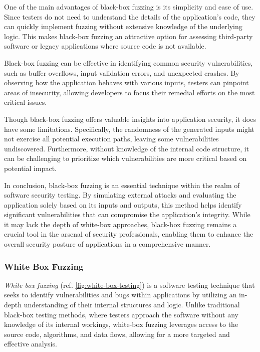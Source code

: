 One of the main advantages of black-box fuzzing is its simplicity and ease of use. Since testers do not need to understand the details of the application’s code, they can quickly implement fuzzing without extensive knowledge of the underlying logic. This makes black-box fuzzing an attractive option for assessing third-party software or legacy applications where source code is not available.

Black-box fuzzing can be effective in identifying common security vulnerabilities, such as buffer overflows, input validation errors, and unexpected crashes. By observing how the application behaves with various inputs, testers can pinpoint areas of insecurity, allowing developers to focus their remedial efforts on the most critical issues.

Though black-box fuzzing offers valuable insights into application security, it does have some limitations. Specifically, the randomness of the generated inputs might not exercise all potential execution paths, leaving some vulnerabilities undiscovered. Furthermore, without knowledge of the internal code structure, it can be challenging to prioritize which vulnerabilities are more critical based on potential impact.

In conclusion, black-box fuzzing is an essential technique within the realm of software security testing. By simulating external attacks and evaluating the application solely based on its inputs and outputs, this method helps identify significant vulnerabilities that can compromise the application’s integrity. While it may lack the depth of white-box approaches, black-box fuzzing remains a crucial tool in the arsenal of security professionals, enabling them to enhance the overall security posture of applications in a comprehensive manner. \cite{godefroid_random_2007}

\subsubsection{White Box Fuzzing}
\label{sec:white-box}
\textit{White box fuzzing} (ref. \autoref{fig:white-box-testing}) is a software testing technique that seeks to identify vulnerabilities and bugs within applications by utilizing an in-depth understanding of their internal structures and logic. Unlike traditional black-box testing methods, where testers approach the software without any knowledge of its internal workings, white-box fuzzing leverages access to the source code, algorithms, and data flows, allowing for a more targeted and effective analysis.

